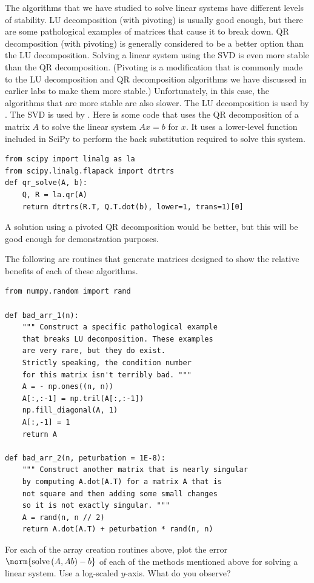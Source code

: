 \begin{example}
The algorithms that we have studied to solve linear systems have different levels of stability.
LU decomposition (with pivoting) is usually good enough, but there are some pathological examples of matrices that cause it to break down.
QR decomposition (with pivoting) is generally considered to be a better option than the LU decomposition.
Solving a linear system using the SVD is even more stable than the QR decomposition.
(Pivoting is a modification that is commonly made to the LU decomposition and QR decomposition algorithms we have discussed in earlier labs to make them more stable.)
Unfortunately, in this case, the algorithms that are more stable are also slower.
The LU decomposition is used by .
The SVD is used by .
Here is some code that uses the QR decomposition of a matrix $A$ to solve the linear system $A x = b$ for $x$.
It uses a lower-level function included in SciPy to perform the back substitution required to solve this system.
\begin{lstlisting}
from scipy import linalg as la
from scipy.linalg.flapack import dtrtrs
def qr_solve(A, b):
    Q, R = la.qr(A)
    return dtrtrs(R.T, Q.T.dot(b), lower=1, trans=1)[0]
\end{lstlisting}
A solution using a pivoted QR decomposition would be better, but this will be good enough for demonstration purposes.

The following are routines that generate matrices designed to show the relative benefits of each of these algorithms.
\begin{lstlisting}
from numpy.random import rand

def bad_arr_1(n):
    """ Construct a specific pathological example
    that breaks LU decomposition. These examples
    are very rare, but they do exist.
    Strictly speaking, the condition number
    for this matrix isn't terribly bad. """
    A = - np.ones((n, n))
    A[:,:-1] = np.tril(A[:,:-1])
    np.fill_diagonal(A, 1)
    A[:,-1] = 1
    return A

def bad_arr_2(n, peturbation = 1E-8):
    """ Construct another matrix that is nearly singular
    by computing A.dot(A.T) for a matrix A that is
    not square and then adding some small changes
    so it is not exactly singular. """
    A = rand(n, n // 2)
    return A.dot(A.T) + peturbation * rand(n, n)
\end{lstlisting}
\end{example}

\begin{problem}
For each of the array creation routines above, plot the error $\norm{\text{solve}\left(A, A b\right) - b}$ of each of the methods mentioned above for solving a linear system.
Use a log-scaled $y$-axis.
What do you observe?
\end{problem}

